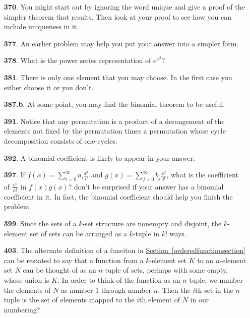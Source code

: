 \documentclass[10pt,]{book}
\theoremstyle{plain}
\theoremstyle{definition}
\theoremstyle{definition}
\numberwithin{equation}{chapter}
\begin{document}
\begin{itemize}[itemsep=1em]
\item[\textbf{370}.]You might start out by ignoring the word unique and give a proof of the simpler theorem that results. Then look at your proof to see how you can include uniqueness in it.%

\item[\textbf{377}.]An earlier problem may help you put your answer into a simpler form.%

\item[\textbf{378}.]What is the power series representation of \(e^{x^2}\)?%

\item[\textbf{381}.]There is only one element that you may choose. In the first case you either choose it or you don't.%

\item[\textbf{387.b}.]At some point, you may find the binomial theorem to be useful.%

\item[\textbf{391}.]Notice that any permutation is a product of a derangement of the elements not fixed by the permutation times a permutation whose cycle decomposition consists of one-cycles.%

\item[\textbf{392}.]A binomial coefficient is likely to appear in your answer.%

\item[\textbf{397}.]If \(f(x) = \sum_{i=0}^\infty a_i \frac{x^i}{i!}\) and \(g(x) = \sum_{j=0}^\infty b_j\frac{x^j}{j!}\), what is the coefficient of \(\frac{x^n}{n!}\) in \(f(x)g(x)\)?  don't be surprised if your answer has a binomial coefficient in it.  In fact, the binomial coefficient should help you finish the problem.%

\item[\textbf{399}.]Since the sets of a \(k\)-set structure are nonempty and disjoint, the \(k\)-element set of sets can be arranged as a \(k\)-tuple in \(k!\) ways.%

\item[\textbf{403}.]The alternate definition of a funciton in \hyperref[orderedfunctionsection]{Section~\ref{orderedfunctionsection}} can be restated to say that a function from a \(k\)-element set \(K\) to an \(n\)-element set \(N\) can be thought of as an \(n\)-tuple of sets, perhaps with some empty, whose union is \(K\). In order to think of the function as an \(n\)-tuple, we number the elements of \(N\) as number 1 through number \(n\). Then the \(i\)th set in the \(n\)-tuple is the set of elements mapped to the \(i\)th element of \(N\) in our numbering?%


\end{itemize}
\end{document}
